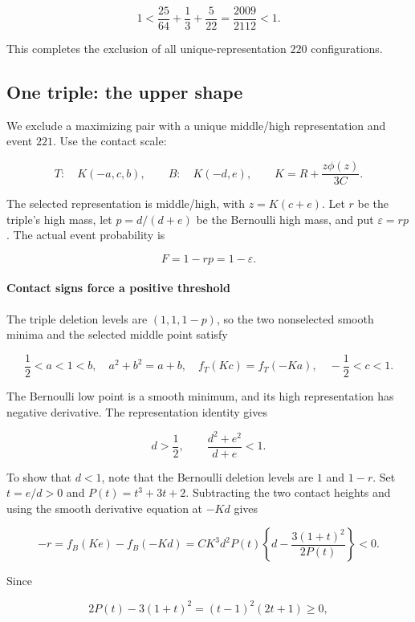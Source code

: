 \[
 \boxed{\quad 1<\frac{25}{64}+\frac13+\frac5{22}
           =\frac{2009}{2112}<1.\quad}
\]

This completes the exclusion of all unique-representation $220$ configurations.
\subsection{One triple: the upper shape}\label{contact:one-triple-bernoulli-upper-shape}

We exclude a maximizing pair with a unique middle/high representation
and event $221$. Use the contact scale:


\[
 T:\quad K(-a,c,b),\qquad B:\quad K(-d,e),\qquad
 K=R+\frac{z\phi(z)}{3C}.
\]

The selected representation is middle/high, with $z=K(c+e)$. Let $r$ be the
triple's high mass, let $p=d/(d+e)$ be the Bernoulli high mass, and put
$\varepsilon=rp$. The actual event probability is

\[
 F=1-rp=1-\varepsilon.
\tag{B.10.1}\label{contact:one-triple-bernoulli-upper-shape-1}
\]

\paragraph{Contact signs force a positive threshold}

The triple deletion levels are $(1,1,1-p)$, so the two nonselected
smooth minima and the selected middle point satisfy

\[
 \frac12<a<1<b,\quad a^2+b^2=a+b,\quad
 f_T(Kc)=f_T(-Ka),\quad -\frac12<c<1.
\tag{B.10.2}\label{contact:one-triple-bernoulli-upper-shape-2}
\]

The Bernoulli low point is a smooth minimum, and its high representation has
negative derivative. The representation identity gives

\[
 d>\frac12,\qquad \frac{d^2+e^2}{d+e}<1.
\tag{B.10.3}\label{contact:one-triple-bernoulli-upper-shape-3}
\]

To show that $d<1$, note that the Bernoulli deletion levels are $1$ and $1-r$. Set $t=e/d>0$ and
$P(t)=t^3+3t+2$. Subtracting the two contact heights and using the smooth
derivative equation at $-Kd$ gives

\[
 -r=f_B(Ke)-f_B(-Kd)
   =CK^3 d^2 P(t)
      \left\{d-\frac{3(1+t)^2}{2P(t)}\right\}<0.
\tag{B.10.4}\label{contact:one-triple-bernoulli-upper-shape-4}
\]

Since

\[
 2P(t)-3(1+t)^2=(t-1)^2(2t+1)\geq0,
\]

